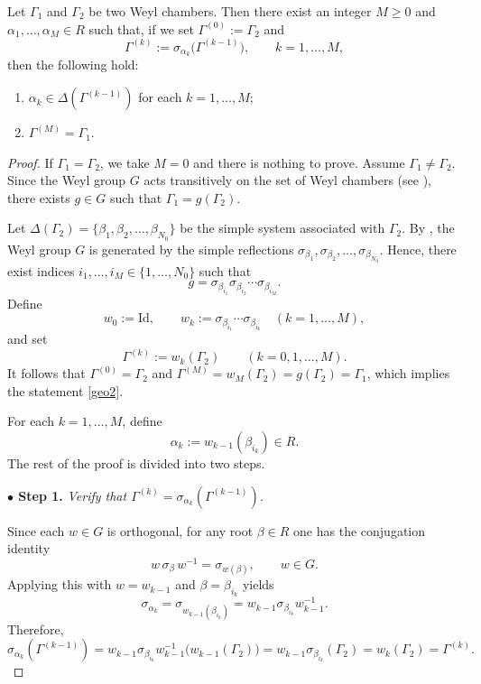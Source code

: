 \documentclass[12pt]{amsart}
\begin{document}
\begin{lemma}\label{lem:gallery-simple}
Let $\Gamma_1$ and $\Gamma_2$ be two Weyl chambers. Then there exist an integer $M\ge 0$ and
$\alpha_1,\dots,\alpha_M\in R$ such that, if we set $\Gamma^{(0)}:=\Gamma_2$ and
\[
\Gamma^{(k)}:=\sigma_{\alpha_k}\big(\Gamma^{(k-1)}\big),\qquad k=1,\dots,M,
\]
then the following hold:
\begin{enumerate}
  \item\label{geo1} $\alpha_k\in \Delta(\Gamma^{(k-1)})$ for each $k=1,\dots,M$;
  \item\label{geo2} $\Gamma^{(M)}=\Gamma_1$.
\end{enumerate}
\end{lemma}
\begin{proof}
If $\Gamma_1=\Gamma_2$, we take $M=0$ and there is nothing to prove. Assume $\Gamma_1\neq \Gamma_2$.
Since the Weyl group $G$ acts transitively on the set of Weyl chambers (see \cite[Theorem 2.12 (2)]{HeckmanCoxeterGroups}), there exists
$g\in G$ such that $\Gamma_1=g(\Gamma_2)$.

Let $\Delta(\Gamma_2)=\{\beta_1,\beta_2,\ldots,\beta_{N_0}\}$ be the simple system associated with $\Gamma_2$.
By \cite[Theorem 2.12(4)]{HeckmanCoxeterGroups}, the Weyl group $G$ is generated by the simple reflections $\sigma_{\beta_1},\sigma_{\beta_2},\ldots,\sigma_{\beta_{N_0}}$. Hence, there exist indices
$i_1,\ldots,i_M\in\{1,\ldots,N_0\}$ such that
\[
g=\sigma_{\beta_{i_1}}\sigma_{\beta_{i_2}}\cdots \sigma_{\beta_{i_M}}.
\]
Define
\[
w_0:=\mathrm{Id},\qquad w_k:=\sigma_{\beta_{i_1}}\cdots \sigma_{\beta_{i_k}}\quad (k=1,\ldots,M),
\]
and set
\[
\Gamma^{(k)}:=w_k(\Gamma_2)\qquad (k=0,1,\ldots,M).
\]
It follows that $\Gamma^{(0)}=\Gamma_2$ and $\Gamma^{(M)}=w_M(\Gamma_2)=g(\Gamma_2)=\Gamma_1$, which implies the statement \eqref{geo2}.

For each $k=1,\ldots,M$, define
\[
\alpha_k:=w_{k-1}(\beta_{i_k})\in R.
\]
The rest of the proof is divided into two steps.

{\bf $\bullet$ Step 1.} {\it Verify that $\Gamma^{(k)}=\sigma_{\alpha_k}(\Gamma^{(k-1)})$.}

Since each $w\in G$ is orthogonal, for any root $\beta\in R$ one has the conjugation identity
\[
w\,\sigma_{\beta}\,w^{-1}=\sigma_{w(\beta)},\qquad w\in G.
\]
Applying this with $w=w_{k-1}$ and $\beta=\beta_{i_k}$ yields
\[
\sigma_{\alpha_k}=\sigma_{w_{k-1}(\beta_{i_k})}=w_{k-1}\sigma_{\beta_{i_k}}w_{k-1}^{-1}.
\]
Therefore,
\[
\sigma_{\alpha_k}(\Gamma^{(k-1)})
= w_{k-1}\sigma_{\beta_{i_k}}w_{k-1}^{-1}\big(w_{k-1}(\Gamma_2)\big)
= w_{k-1}\sigma_{\beta_{i_k}}(\Gamma_2)
= w_k(\Gamma_2)
= \Gamma^{(k)}.
\]


\end{proof}
\end{document}
